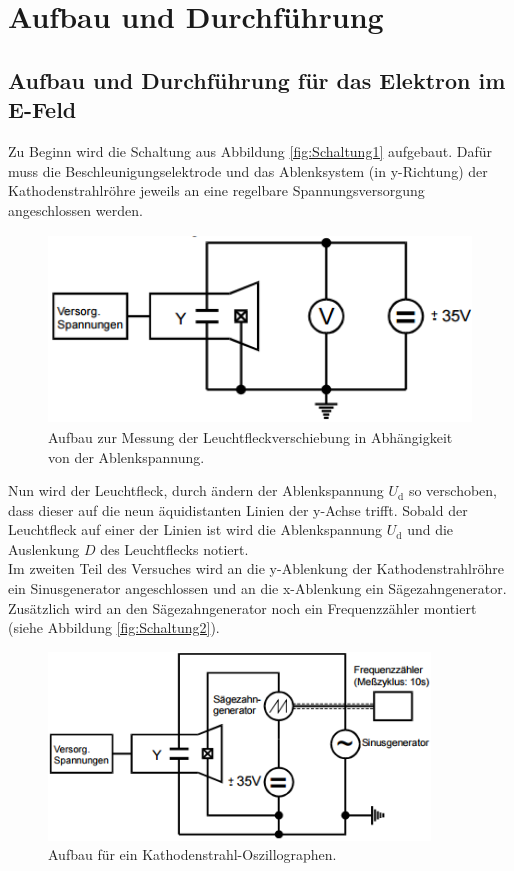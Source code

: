 \section{Aufbau und Durchführung}
\label{sec:Durchführung}
\subsection{Aufbau und Durchführung für das Elektron im E-Feld}
Zu Beginn wird die Schaltung aus Abbildung \eqref{fig:Schaltung1} aufgebaut. Dafür muss die Beschleunigungselektrode und das Ablenksystem (in y-Richtung) der Kathodenstrahlröhre jeweils an eine regelbare Spannungsversorgung angeschlossen werden.

\begin{figure}[H]
  \centering
  \includegraphics[height=5cm]{picture/Schaltung1}
  \caption{Aufbau zur Messung der Leuchtfleckverschiebung in Abhängigkeit von der Ablenkspannung. \cite[5]{V501}}
  \label{fig:Schaltung1}
\end{figure}

Nun wird der Leuchtfleck, durch ändern der Ablenkspannung $U_\text{d}$ so verschoben, dass dieser auf die neun äquidistanten Linien der y-Achse trifft. Sobald der Leuchtfleck auf einer der Linien ist wird die Ablenkspannung $U_\text{d}$ und die Auslenkung $D$ des Leuchtflecks notiert. \\
Im zweiten Teil des Versuches wird an die y-Ablenkung der Kathodenstrahlröhre ein Sinusgenerator angeschlossen und an die x-Ablenkung ein Sägezahngenerator. Zusätzlich wird an den Sägezahngenerator noch ein Frequenzzähler montiert (siehe Abbildung \eqref{fig:Schaltung2}).

\begin{figure}[H]
  \centering
  \includegraphics[height=5cm]{picture/Schaltung2}
  \caption{Aufbau für ein Kathodenstrahl-Oszillographen. \cite[5]{V501}}
  \label{fig:Schaltung2}
\end{figure}

